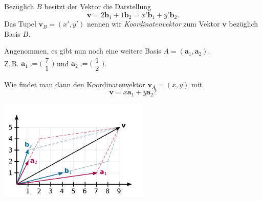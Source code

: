 \documentclass[9pt]{beamer}
\newcommand{\bv}[1]{\mathbf{#1}}
\newcommand{\icol}[1]{
  \big(\!\begin{smallmatrix}#1\end{smallmatrix}\!\big)%
}
\newcommand{\parspace}{\vspace{0.8em}}
\begin{document}
\begin{frame}[t]
\vspace{4em}
Bezüglich $B$ besitzt der Vektor die Darstellung
\[\bv v = 2\bv b_1 + 1\bv b_2 = x'\bv b_1 + y'\bv b_2.
\]\pause
Das Tupel $\bv v_B = (x',y')$ nennen wir \emph{Koordinatenvektor}
zum Vektor $\bv v$ bezüglich Basis $B$.\pause

\parspace
Angenommen, es gibt nun noch eine weitere Basis $A=(\bv a_1,\bv a_2)$.\\
Z.\,B. $\bv a_1:=\icol{7\\ 1}$ und $\bv a_2:=\icol{1\\ 2}$.\pause

\vspace{1.2em}
Wie findet man dann den Koordinatenvektor $\bv v_A=(x,y)$ mit
\[\bv v = x\bv a_1 + y\bv a_2?\]
\end{frame}

\begin{frame}
\begin{center}
\includegraphics[width=72mm]{img/Vektor-in-Basis-BA.pdf}
\end{center}
\end{frame}
\end{document}
